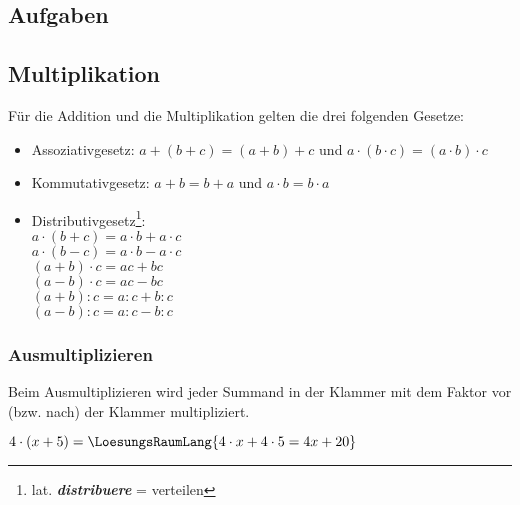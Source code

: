 \subsection*{Aufgaben}


\newpage
\subsection{Multiplikation}

Für die Addition und die Multiplikation gelten die drei folgenden
Gesetze:



\begin{gesetz}{}{}
\begin{itemize}
\item  Assoziativgesetz:
  $a+(b+c) = (a+b) +c$ und $a\cdot(b\cdot{}c) = (a\cdot b)\cdot c$
\item Kommutativgesetz:
  $a+b = b+a$ und $a\cdot b = b \cdot a$
\item Distributivgesetz\footnote{lat. \textit{\textbf{distribuere}} = verteilen}:\\
  $a\cdot (b+c) = a\cdot b + a\cdot c$\\
  $a\cdot (b-c) = a\cdot b - a\cdot c$\\
  $(a+b)\cdot c = ac + bc$\\
  $(a-b)\cdot c = ac - bc$\\
  $(a+b):c = a:c + b:c$\\
  $(a-b):c = a:c - b:c$\\
  
  \end{itemize}
\end{gesetz}

\newpage

\subsubsection{Ausmultiplizieren}
Beim Ausmultiplizieren wird jeder Summand in der Klammer mit dem
Faktor vor (bzw. nach) der Klammer multipliziert.
\begin{beispiel}{}{}
  $4\cdot (x + 5) =\LoesungsRaumLang{4\cdot x + 4\cdot 5 = 4x + 20}$
\end{beispiel}

